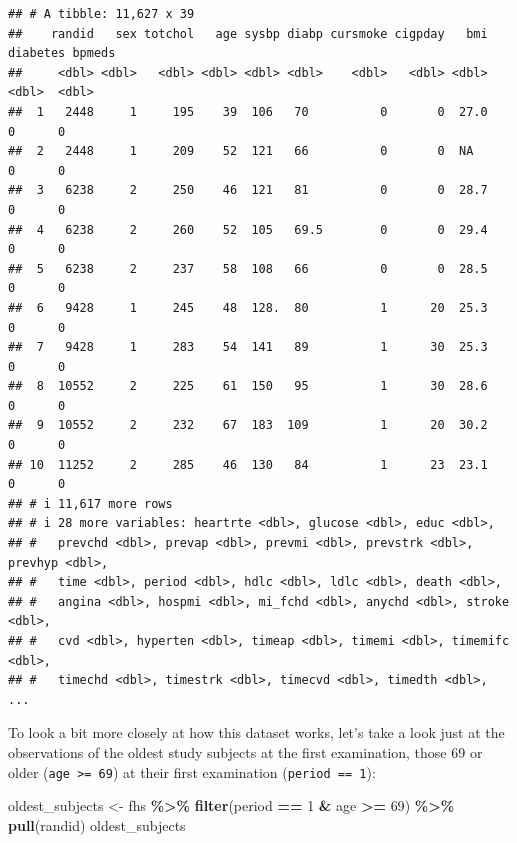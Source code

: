 \documentclass[
]{book}
\newenvironment{Shaded}{\begin{snugshade}}{\end{snugshade}}
\newcommand{\DecValTok}[1]{\textcolor[rgb]{0.00,0.00,0.81}{#1}}
\newcommand{\FunctionTok}[1]{\textcolor[rgb]{0.13,0.29,0.53}{\textbf{#1}}}
\newcommand{\NormalTok}[1]{#1}
\newcommand{\OtherTok}[1]{\textcolor[rgb]{0.56,0.35,0.01}{#1}}
\newcommand{\SpecialCharTok}[1]{\textcolor[rgb]{0.81,0.36,0.00}{\textbf{#1}}}
\begin{document}
\begin{verbatim}
## # A tibble: 11,627 x 39
##    randid   sex totchol   age sysbp diabp cursmoke cigpday   bmi diabetes bpmeds
##     <dbl> <dbl>   <dbl> <dbl> <dbl> <dbl>    <dbl>   <dbl> <dbl>    <dbl>  <dbl>
##  1   2448     1     195    39  106   70          0       0  27.0        0      0
##  2   2448     1     209    52  121   66          0       0  NA          0      0
##  3   6238     2     250    46  121   81          0       0  28.7        0      0
##  4   6238     2     260    52  105   69.5        0       0  29.4        0      0
##  5   6238     2     237    58  108   66          0       0  28.5        0      0
##  6   9428     1     245    48  128.  80          1      20  25.3        0      0
##  7   9428     1     283    54  141   89          1      30  25.3        0      0
##  8  10552     2     225    61  150   95          1      30  28.6        0      0
##  9  10552     2     232    67  183  109          1      20  30.2        0      0
## 10  11252     2     285    46  130   84          1      23  23.1        0      0
## # i 11,617 more rows
## # i 28 more variables: heartrte <dbl>, glucose <dbl>, educ <dbl>,
## #   prevchd <dbl>, prevap <dbl>, prevmi <dbl>, prevstrk <dbl>, prevhyp <dbl>,
## #   time <dbl>, period <dbl>, hdlc <dbl>, ldlc <dbl>, death <dbl>,
## #   angina <dbl>, hospmi <dbl>, mi_fchd <dbl>, anychd <dbl>, stroke <dbl>,
## #   cvd <dbl>, hyperten <dbl>, timeap <dbl>, timemi <dbl>, timemifc <dbl>,
## #   timechd <dbl>, timestrk <dbl>, timecvd <dbl>, timedth <dbl>, ...
\end{verbatim}

To look a bit more closely at how this dataset works, let's take a look just at the observations of the oldest study subjects at the first examination, those 69 or older (\texttt{age\ \textgreater{}=\ 69}) at their first examination (\texttt{period\ ==\ 1}):

\begin{Shaded}
\begin{Highlighting}[]
\NormalTok{oldest\_subjects }\OtherTok{\textless{}{-}}\NormalTok{ fhs }\SpecialCharTok{\%\textgreater{}\%} 
  \FunctionTok{filter}\NormalTok{(period }\SpecialCharTok{==} \DecValTok{1} \SpecialCharTok{\&}\NormalTok{ age }\SpecialCharTok{\textgreater{}=} \DecValTok{69}\NormalTok{) }\SpecialCharTok{\%\textgreater{}\%} 
  \FunctionTok{pull}\NormalTok{(randid)}
\NormalTok{oldest\_subjects}
\end{Highlighting}
\end{Shaded}
\end{document}
